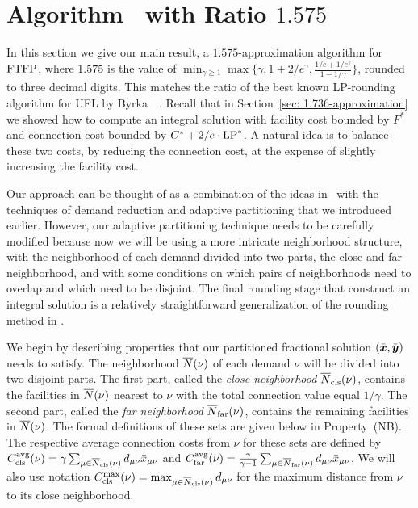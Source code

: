 
\section{Algorithm~{\EBGS} with Ratio $1.575$}\label{sec: 1.575-approximation}

In this section we give our main result, a $1.575$-approximation
algorithm for $\mbox{\rm FTFP}$, where $1.575$ is the value of $\min_{\gamma\geq
  1}\max\{\gamma, 1+2/e^\gamma, \frac{1/e+1/e^\gamma}{1-1/\gamma}\}$,
rounded to three decimal digits. This matches the ratio of the best
known LP-rounding algorithm for UFL by
Byrka~{\etal}~\cite{ByrkaGS10}. Recall that in Section~\ref{sec:
  1.736-approximation} we showed how to compute an integral solution
with facility cost bounded by $F^\ast$ and connection cost bounded by
$C^\ast + 2/e\cdot\mbox{\rm LP}^\ast$. A natural idea is to balance these two
costs, by reducing the connection cost, at the expense of slightly
increasing the facility cost.

Our approach can be thought of as a combination of the ideas
in~\cite{ByrkaGS10} with the techniques of demand reduction and
adaptive partitioning that we introduced earlier. However, our
adaptive partitioning technique needs to be carefully modified because
now we will be using a more intricate neighborhood structure, with the
neighborhood of each demand divided into two parts, the close and far
neighborhood, and with some conditions on which pairs of neighborhoods
need to overlap and which need to be disjoint. The final rounding
stage that construct an integral solution is a relatively
straightforward generalization of the rounding method in
\cite{ByrkaGS10}.

We begin by describing properties that our partitioned fractional
solution $(\bar{\boldsymbol{x}},\bar{\boldsymbol{y}})$ needs to satisfy. The neighborhood
${\overline{N}}(\nu)$ of each demand $\nu$ will be divided into two disjoint
parts.  The first part, called the \emph{close neighborhood}
${\overline{N}}_{\text{cls}}(\nu)$, contains the facilities in ${\overline{N}}(\nu)$ nearest to
$\nu$ with the total connection value equal $1/\gamma$. The second
part, called the \emph{far neighborhood} ${\overline{N}}_{\text{far}}(\nu)$, contains
the remaining facilities in ${\overline{N}}(\nu)$. The formal definitions of
these sets are given below in Property~(NB).  The respective average
connection costs from $\nu$ for these sets are defined by
$C_{\text{cls}}^{{\mbox{\scriptsize\rm avg}}}(\nu)=\gamma\sum_{\mu\in{\overline{N}}_{\text{cls}}(\nu)}
d_{\mu\nu}{\bar x}_{\mu\nu}$ and
$C_{\text{far}}^{{\mbox{\scriptsize\rm avg}}}(\nu)=\frac{\gamma}{\gamma-1}\sum_{\mu\in{\overline{N}}_{\text{far}}(\nu)}
d_{\mu\nu}{\bar x}_{\mu\nu}$. We will also use notation
$C_{\text{cls}}^{\max}(\nu)=\max_{\mu\in{\overline{N}}_{\text{cls}}(\nu)} d_{\mu\nu}$ for the maximum
distance from $\nu$ to its close neighborhood.

